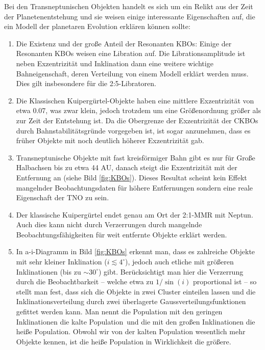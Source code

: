 \documentclass[12pt,a4paper,twoside]{article}
\renewcommand{\cite}{\citep}
\begin{document}
\noindent
Bei den Transneptunischen Objekten handelt es sich um ein Relikt aus der Zeit der Planetenentstehung und sie weisen einige interessante Eigenschaften auf, die ein Modell der planetaren Evolution erklären können sollte: %
\begin{enumerate}
\item Die Existenz und der große Anteil der Resonanten KBOs: Einige der Resonanten KBOs weisen eine Libration auf. Die Librationsamplitude ist neben Exzentrizität und Inklination dann eine weitere wichtige Bahneigenschaft, deren Verteilung von einem Modell erklärt werden muss. Dies gilt insbesondere für die 2:5-Libratoren\cite{Levison2008}. %
\item Die Klassischen Kuipergürtel-Objekte haben eine mittlere Exzentrizität von etwa 0.07, was zwar klein, jedoch trotzdem um eine Größenordnung größer als zur Zeit der Entstehung ist. Da die Obergrenze der Exzentrizität der CKBOs durch Bahnstabilitätsgründe vorgegeben ist, ist sogar anzunehmen, dass es früher Objekte mit noch deutlich höherer Exzentrizität gab.
\item Transneptunische Objekte mit fast kreisförmiger Bahn gibt es nur für Große Halbachsen bis zu etwa 44 AU, danach steigt die Exzentrizität mit der Entfernung an (siehe Bild \ref{fig:KBOs})\cite{Levison2008}. Dieses Resultat scheint kein Effekt mangelnder Beobachtungsdaten für höhere Entfernungen sondern eine reale Eigenschaft der TNO zu sein\cite{Levison2008}.
\item Der klassische Kuipergürtel endet genau am Ort der 2:1-MMR mit Neptun\cite{Levison2008}. Auch dies kann nicht durch Verzerrungen durch mangelnde Beobachtungsfähigkeiten für weit entfernte Objekte erklärt werden.
\item In a-i-Diagramm in Bild \ref{fig:KBOs} erkennt man, dass es zahlreiche Objekte mit sehr kleiner Inklination ($i\lesssim 4^\circ$), jedoch auch etliche mit größeren Inklinationen (bis zu $\sim 30^\circ$) gibt. Berücksichtigt man hier die Verzerrung durch die Beobachtbarkeit -- welche etwa zu $1/\sin(i)$ proportional ist -- so stellt man fest, dass sich die Objekte in zwei Cluster einteilen lassen und die Inklinationsverteilung durch zwei überlagerte Gaussverteilungsfunktionen gefittet werden kann. %
Man nennt die Population mit den geringen Inklinationen die \glqq kalte Population\grqq\ und die mit den großen Inklinationen die \glqq heiße Population\grqq. Obwohl wir von der kalten Population wesentlich mehr Objekte kennen, ist die heiße Population in Wirklichkeit die größere\cite{Levison2008}.

\end{enumerate}
\end{document}
